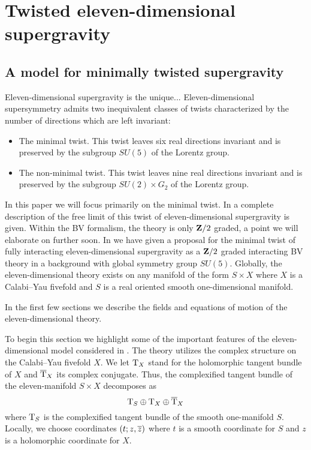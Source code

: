 

%

\section{Twisted eleven-dimensional supergravity}
%
\subsection{A model for minimally twisted supergravity}

Eleven-dimensional supergravity is the unique...
Eleven-dimensional supersymmetry admits two inequivalent classes of twists characterized by the number of directions which are left invariant:
\begin{itemize}
\item 
The minimal twist. 
This twist leaves six real directions invariant and is preserved by the subgroup $SU(5)$ of the Lorentz group. 
\item 
The non-minimal twist. 
This twist leaves nine real directions invariant and is preserved by the subgroup $SU(2) \times G_2$ of the Lorentz group. 
\end{itemize}

In this paper we will focus primarily on the minimal twist. 
In \cite{SWspinor} a complete description of the free limit of this twist of eleven-dimensional supergravity is given.
Within the BV formalism, the theory is only $\mathbf{Z}/2$ graded, a point we will elaborate on further soon. 
In \cite{RSW} we have given a proposal for the minimal twist of fully interacting eleven-dimensional supergravity as a $\mathbf{Z}/2$ graded interacting BV theory in a background with global symmetry group $SU(5)$.
Globally, the eleven-dimensional theory exists on any manifold of the form $S \times X$ where $X$ is a Calabi--Yau fivefold and $S$ is a real oriented smooth one-dimensional manifold.

In the first few sections we describe the fields and equations of motion of the eleven-dimensional theory. 

%

\parsec[s:sugrafields]

To begin this section we highlight some of the important features of the eleven-dimensional model considered in \cite{RSW}. 
The theory utilizes the complex structure on the Calabi--Yau fivefold $X$.
We let ${\rm T}_X$ stand for the holomorphic tangent bundle of $X$ and $\overline{{\rm T}}_X$ its complex conjugate.
Thus, the complexified tangent bundle of the eleven-manifold $S \times X$ decomposes as
\[
{\rm T}_S \oplus {\rm T}_X \oplus \overline{{\rm T}}_X 
\]
where ${\rm T}_S$ is the complexified tangent bundle of the smooth one-manifold $S$.
Locally, we choose coordinates $(t;z,\overline{z})$ where $t$ is a smooth coordinate for $S$ and $z$ is a holomorphic coordinate for $X$. 

